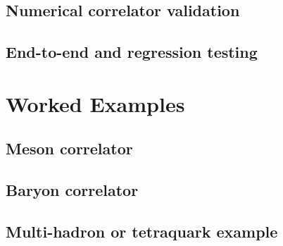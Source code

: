 \documentclass[11pt]{article}
\begin{document}

\subsection{Numerical correlator validation}


\subsection{End-to-end and regression testing}


\section{Worked Examples}
\label{sec:examples}


\subsection{Meson correlator}


\subsection{Baryon correlator}


\subsection{Multi-hadron or tetraquark example}

\end{document}
